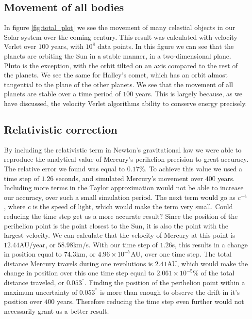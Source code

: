 \documentclass[%
 reprint,
nofootinbib,
aps,
]{revtex4-1}
\begin{document}
\subsection{Movement of all bodies}
In figure \vref{fig:total_plot} we see the movement of many celestial objects in our Solar system over the coming century. This result was calculated with velocity Verlet over $100$ years, with $10^{8}$ data points. In this figure we can see that the planets are orbiting the Sun in a stable manner, in a two-dimensional plane. Pluto is the exception, with the orbit tilted on an axis compared to the rest of the planets. We see the same for Halley's comet, which has an orbit almost tangential to the plane of the other planets. We see that the movement of all planets are stable over a time period of $100$ years. This is largely because, as we have discussed, the velocity Verlet algorithms ability to conserve energy precisely.

\subsection{Relativistic correction}
By including the relativistic term in Newton's gravitational law we were able to reproduce the analytical value of Mercury's perihelion precision to great accuracy. The relative error we found was equal to $0.17\%$. To achieve this value we used a time step of $1.26$ seconds, and simulated Mercury's movement over $400$ years. Including more terms in the Taylor approximation would not be able to increase our accuracy, over such a small simulation period. The next term would go as $c^{-4}$, where $c$ is the speed of light, which would make the term very small. Could reducing the time step get us a more accurate result? Since the position of the perihelion point is the point closest to the Sun, it is also the point with the largest velocity. We can calculate that the velocity of Mercury at this point is $12.44$AU/year, or $58.98$km/s. With our time step of $1.26$s, this results in a change in position equal to $74.3$km, or $4.96\times 10^{-7}$AU, over one time step. The total distance Mercury travels during one revolutions is $2.41$AU, which would make the change in position over this one time step equal to $2.061\times 10^{-5}\%$ of the total distance traveled, or $0.053^{''}$. Finding the position of the perihelion point within a maximum uncertainty of $0.053^{''}$ is more than enough to observe the drift in it's position over $400$ years. Therefore reducing the time step even further would not necessarily grant us a better result.
\end{document}
